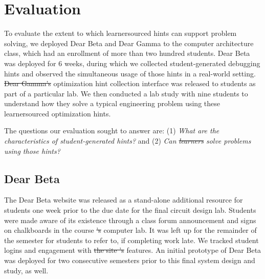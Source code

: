 \documentclass[12pt,twoside]{mitthesis}
\providecommand{\DIFaddtex}[1]{{\protect\color{blue}\uwave{#1}}} %
\providecommand{\DIFdeltex}[1]{{\protect\color{red}\sout{#1}}}                      %
\providecommand{\DIFaddbegin}{} %
\providecommand{\DIFaddend}{} %
\providecommand{\DIFdelbegin}{} %
\providecommand{\DIFdelend}{} %
\providecommand{\DIFaddbeginFL}{} %
\providecommand{\DIFaddendFL}{} %
\providecommand{\DIFdelbeginFL}{} %
\providecommand{\DIFdelendFL}{} %
\providecommand{\DIFadd}[1]{\texorpdfstring{\DIFaddtex{#1}}{#1}} %
\providecommand{\DIFdel}[1]{\texorpdfstring{\DIFdeltex{#1}}{}} %
\begin{document}
{{{{{{{{{{\begin{figure}
\DIFdelbeginFL %
\DIFdelendFL \DIFaddbeginFL \label{fig:sankey}
\DIFaddendFL \end{figure}


\section{Evaluation}

To evaluate the extent to which learnersourced hints can support problem solving, we deployed Dear Beta and Dear Gamma to the computer architecture class, which had an enrollment of more than two hundred students. Dear Beta was deployed for 6 weeks, during which we collected student-generated debugging hints and observed the simultaneous usage of those hints in a real-world setting. \DIFdelbegin \DIFdel{Dear Gamma's }\DIFdelend \DIFaddbegin \DIFadd{The Dear Gamma }\DIFaddend optimization hint collection interface was released to students as part of a particular lab. We then conducted a lab study with nine students to understand how they solve a typical engineering problem using these learnersourced optimization hints. \DIFdelbegin %

\DIFdelend The questions our evaluation sought to answer are: (1) {\it What are the characteristics of student-generated hints?} and (2) {\it Can \DIFdelbegin \DIFdel{learners }\DIFdelend \DIFaddbegin \DIFadd{students }\DIFaddend solve problems using those hints?}

\DIFdelbegin %
\DIFdelend \DIFaddbegin \subsection{Dear Beta}
\DIFaddend The Dear Beta website was released as a stand-alone additional resource for students one week prior to the due date for the final circuit design lab. Students were made aware of its existence through a class forum announcement and signs on chalkboards in the course \DIFdelbegin \DIFdel{'s }\DIFdelend computer lab. It was left up for the remainder of the semester for students to refer to, if completing work late. We tracked student logins and engagement with \DIFdelbegin \DIFdel{the site 's }\DIFdelend \DIFaddbegin \DIFadd{site }\DIFaddend features. An initial prototype of Dear Beta was deployed for two consecutive semesters prior to this final system design and study, as well.

}}}}}}}}}}
\end{document}

